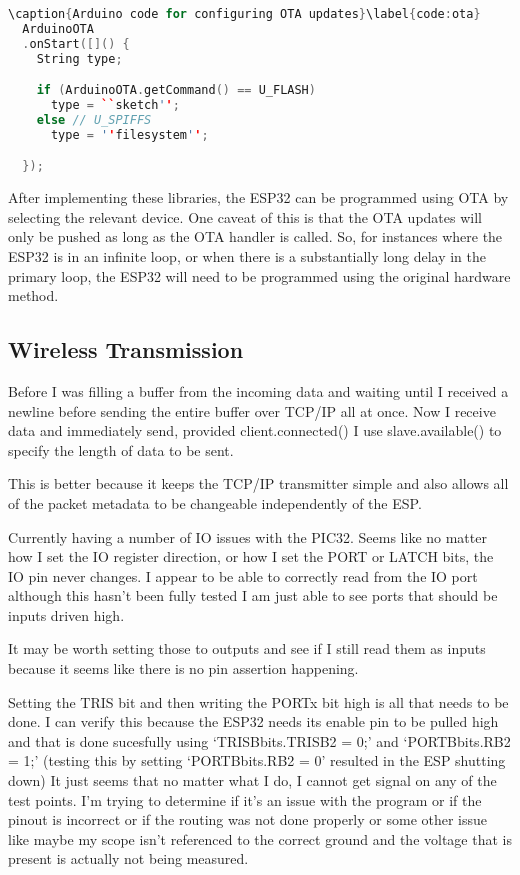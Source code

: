 \begin{lstlisting}[language=C++]
\caption{Arduino code for configuring OTA updates}\label{code:ota}
  ArduinoOTA
  .onStart([]() {
    String type;

    if (ArduinoOTA.getCommand() == U_FLASH)
      type = ``sketch'';
    else // U_SPIFFS
      type = ''filesystem'';

  });

\end{lstlisting}

After implementing these libraries, the ESP32 can be programmed using OTA by selecting the relevant device.
One caveat of this is that the OTA updates will only be pushed as long as the OTA handler is called.
So, for instances where the ESP32 is in an infinite loop, or when there is a substantially long delay in the primary loop,
the ESP32 will need to be programmed using the original hardware method.

\subsection{Wireless Transmission}

Before I was filling a buffer from the incoming data and waiting until I received
a newline before sending the entire buffer over TCP/IP all at once.
Now I receive data and immediately send, provided client.connected()
I use slave.available() to specify the length of data to be sent.

This is better because it keeps the TCP/IP transmitter simple and also allows all
of the packet metadata to be changeable independently of the ESP.

Currently having a number of IO issues with the PIC32.
Seems like no matter how I set the IO register direction, or how I set
the PORT or LATCH bits, the IO pin never changes.
I appear to be able to correctly read from the IO port although this
hasn't been fully tested I am just able to see ports that should be
inputs driven high.

It may be worth setting those to outputs and see if I still read them
as inputs because it seems like there is no pin assertion happening.

Setting the TRIS bit and then writing the PORTx bit high is all that
needs to be done.
I can verify this because the ESP32 needs its enable pin to be pulled
high and that is done sucesfully using `TRISBbits.TRISB2 = 0;' and
`PORTBbits.RB2 = 1;'
(testing this by setting `PORTBbits.RB2 = 0' resulted in the ESP
shutting down)
It just seems that no matter what I do, I cannot get signal on any of
the test points. I'm trying to determine if it's an issue with the
program or if the pinout is incorrect or if the routing was not done
properly or some other issue like maybe my scope isn't referenced to
the correct ground and the voltage that is present is actually not
being measured.

